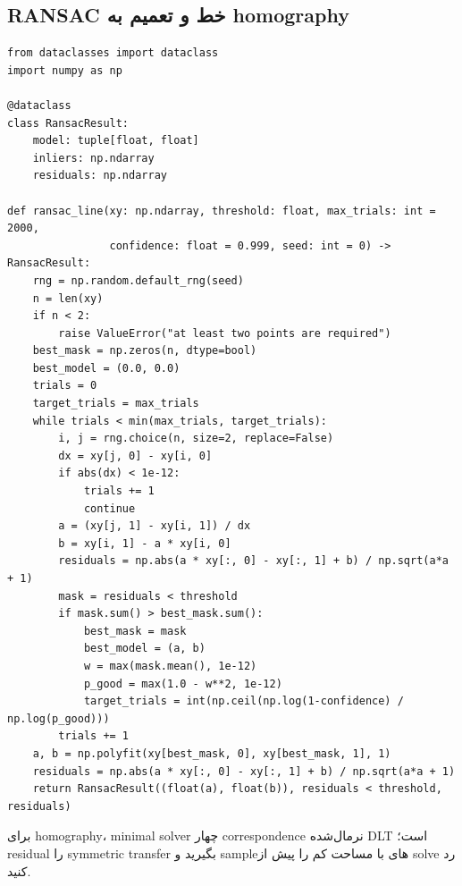 \documentclass[12pt,openany,oneside]{book}
\begin{document}
\subsection{RANSAC خط و تعمیم به homography}
\begin{latin}
\begin{lstlisting}
from dataclasses import dataclass
import numpy as np

@dataclass
class RansacResult:
    model: tuple[float, float]
    inliers: np.ndarray
    residuals: np.ndarray

def ransac_line(xy: np.ndarray, threshold: float, max_trials: int = 2000,
                confidence: float = 0.999, seed: int = 0) -> RansacResult:
    rng = np.random.default_rng(seed)
    n = len(xy)
    if n < 2:
        raise ValueError("at least two points are required")
    best_mask = np.zeros(n, dtype=bool)
    best_model = (0.0, 0.0)
    trials = 0
    target_trials = max_trials
    while trials < min(max_trials, target_trials):
        i, j = rng.choice(n, size=2, replace=False)
        dx = xy[j, 0] - xy[i, 0]
        if abs(dx) < 1e-12:
            trials += 1
            continue
        a = (xy[j, 1] - xy[i, 1]) / dx
        b = xy[i, 1] - a * xy[i, 0]
        residuals = np.abs(a * xy[:, 0] - xy[:, 1] + b) / np.sqrt(a*a + 1)
        mask = residuals < threshold
        if mask.sum() > best_mask.sum():
            best_mask = mask
            best_model = (a, b)
            w = max(mask.mean(), 1e-12)
            p_good = max(1.0 - w**2, 1e-12)
            target_trials = int(np.ceil(np.log(1-confidence) / np.log(p_good)))
        trials += 1
    a, b = np.polyfit(xy[best_mask, 0], xy[best_mask, 1], 1)
    residuals = np.abs(a * xy[:, 0] - xy[:, 1] + b) / np.sqrt(a*a + 1)
    return RansacResult((float(a), float(b)), residuals < threshold, residuals)
\end{lstlisting}
\end{latin}
برای homography، minimal solver چهار correspondence نرمال‌شده DLT است؛ residual را symmetric transfer بگیرید و sampleهای با مساحت کم را پیش از solve رد کنید.
\end{document}
